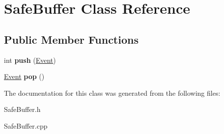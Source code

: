 \hypertarget{classSafeBuffer}{}\section{Safe\+Buffer Class Reference}
\label{classSafeBuffer}
\subsection*{Public Member Functions}
\begin{DoxyCompactItemize}
\item 
\mbox{\label{classSafeBuffer_ac3ed0799ec2e84c97e36b22c83f7abf5}} 
int {\bfseries push} (\hyperlink{classEvent}{Event})
\item 
\mbox{\label{classSafeBuffer_a90a33fca4d838f7c0eef6e8557f3c281}} 
\hyperlink{classEvent}{Event} {\bfseries pop} ()
\end{DoxyCompactItemize}


The documentation for this class was generated from the following files\+:\begin{DoxyCompactItemize}
\item 
Safe\+Buffer.\+h\item 
Safe\+Buffer.\+cpp\end{DoxyCompactItemize}
